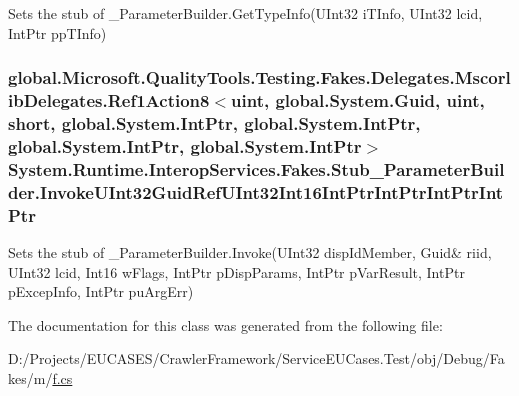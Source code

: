 Sets the stub of \-\_\-\-Parameter\-Builder.\-Get\-Type\-Info(\-U\-Int32 i\-T\-Info, U\-Int32 lcid, Int\-Ptr pp\-T\-Info)

\hypertarget{class_system_1_1_runtime_1_1_interop_services_1_1_fakes_1_1_stub___parameter_builder_a4e7a0398da1835ea5d6c377dd7675964}{
\subsubsection[{Invoke\-U\-Int32\-Guid\-Ref\-U\-Int32\-Int16\-Int\-Ptr\-Int\-Ptr\-Int\-Ptr\-Int\-Ptr}]{\setlength{\rightskip}{0pt plus 5cm}global.\-Microsoft.\-Quality\-Tools.\-Testing.\-Fakes.\-Delegates.\-Mscorlib\-Delegates.\-Ref1\-Action8$<$uint, global.\-System.\-Guid, uint, short, global.\-System.\-Int\-Ptr, global.\-System.\-Int\-Ptr, global.\-System.\-Int\-Ptr, global.\-System.\-Int\-Ptr$>$ System.\-Runtime.\-Interop\-Services.\-Fakes.\-Stub\-\_\-\-Parameter\-Builder.\-Invoke\-U\-Int32\-Guid\-Ref\-U\-Int32\-Int16\-Int\-Ptr\-Int\-Ptr\-Int\-Ptr\-Int\-Ptr}}\label{class_system_1_1_runtime_1_1_interop_services_1_1_fakes_1_1_stub___parameter_builder_a4e7a0398da1835ea5d6c377dd7675964}


Sets the stub of \-\_\-\-Parameter\-Builder.\-Invoke(U\-Int32 disp\-Id\-Member, Guid\& riid, U\-Int32 lcid, Int16 w\-Flags, Int\-Ptr p\-Disp\-Params, Int\-Ptr p\-Var\-Result, Int\-Ptr p\-Excep\-Info, Int\-Ptr pu\-Arg\-Err)



The documentation for this class was generated from the following file\-:\begin{DoxyCompactItemize}
\item 
D\-:/\-Projects/\-E\-U\-C\-A\-S\-E\-S/\-Crawler\-Framework/\-Service\-E\-U\-Cases.\-Test/obj/\-Debug/\-Fakes/m/\hyperlink{m_2f_8cs}{f.\-cs}\end{DoxyCompactItemize}
